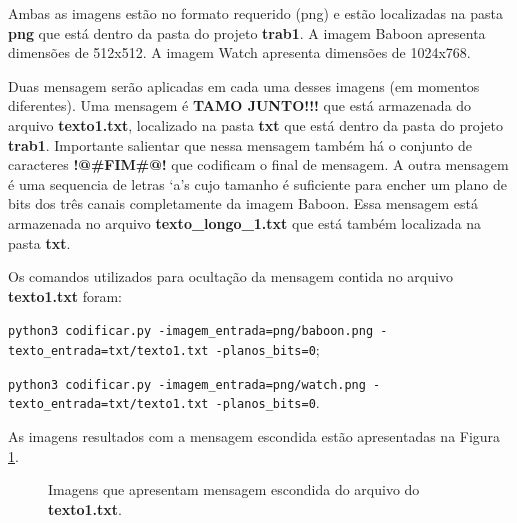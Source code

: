 \documentclass{article}
\begin{document}
\noindent
Ambas as imagens estão no formato requerido (png) e estão localizadas na pasta \textbf{png} que está dentro da pasta do projeto \textbf{trab1}. A imagem Baboon apresenta dimensões de 512x512. A imagem Watch apresenta dimensões de 1024x768. 

Duas mensagem serão aplicadas em cada uma desses imagens (em momentos diferentes). Uma mensagem é \textbf{TAMO JUNTO!!!} que está armazenada do arquivo \textbf{texto1.txt}, localizado na pasta \textbf{txt} que está dentro da pasta do projeto \textbf{trab1}. Importante salientar que nessa mensagem também há o conjunto de caracteres \textbf{!@\#FIM\#@!} que codificam o final de mensagem. A outra mensagem é uma sequencia de letras `a's cujo tamanho é suficiente para encher um plano de bits dos três canais completamente da imagem Baboon. Essa mensagem está armazenada no arquivo \textbf{texto\_longo\_1.txt} que está também localizada na pasta \textbf{txt}.

Os comandos utilizados para ocultação da mensagem contida no arquivo \textbf{texto1.txt} foram:

\lstinline{python3 codificar.py -imagem_entrada=png/baboon.png -texto_entrada=txt/texto1.txt -planos_bits=0};

\lstinline{python3 codificar.py -imagem_entrada=png/watch.png -texto_entrada=txt/texto1.txt -planos_bits=0}.

\noindent
As imagens resultados com a mensagem escondida estão apresentadas na Figura \ref{fig:imagem:saida}.
	
\begin{figure}[htp]%
\centering
{}%
\qquad
{}%
\caption{Imagens que apresentam mensagem escondida do arquivo do \textbf{texto1.txt}.}%
\label{fig:imagem:saida}%
\end{figure}	
\end{document}
